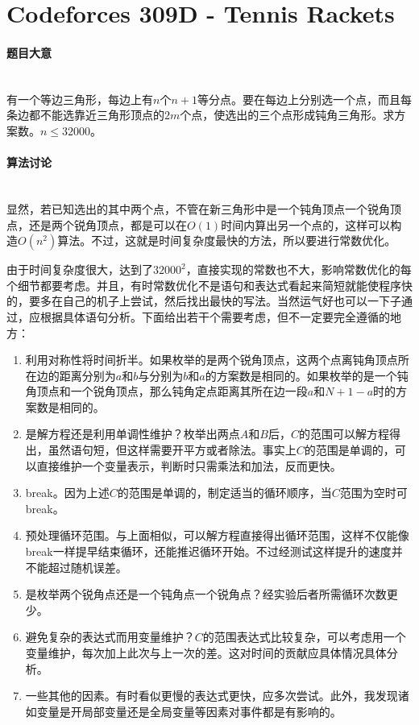 \documentclass[UTF8]{ctexart}
\newcommand{\myparagraph}[1]{\paragraph{#1}\mbox{}\\}
\theoremstyle{nonumberplain}
\begin{document}
	\section{Codeforces 309D - Tennis Rackets}
	
		\myparagraph{题目大意}
		
			有一个等边三角形，每边上有$n$个$n+1$等分点。要在每边上分别选一个点，而且每条边都不能选靠近三角形顶点的$2m$个点，使选出的三个点形成钝角三角形。求方案数。$n \leq 32000$。
		
		\myparagraph{算法讨论}
		
			显然，若已知选出的其中两个点，不管在新三角形中是一个钝角顶点一个锐角顶点，还是两个锐角顶点，都是可以在$O(1)$时间内算出另一个点的，这样可以构造$O(n^2)$算法。不过，这就是时间复杂度最快的方法，所以要进行常数优化。
			
			由于时间复杂度很大，达到了$32000^2$，直接实现的常数也不大，影响常数优化的每个细节都要考虑。并且，有时常数优化不是语句和表达式看起来简短就能使程序快的，要多在自己的机子上尝试，然后找出最快的写法。当然运气好也可以一下子通过，应根据具体语句分析。下面给出若干个需要考虑，但不一定要完全遵循的地方：
			
			\begin{enumerate}
				\item 利用对称性将时间折半。如果枚举的是两个锐角顶点，这两个点离钝角顶点所在边的距离分别为$a$和$b$与分别为$b$和$a$的方案数是相同的。如果枚举的是一个钝角顶点和一个锐角顶点，那么钝角定点距离其所在边一段$a$和$N+1-a$时的方案数是相同的。
				\item 是解方程还是利用单调性维护？枚举出两点$A$和$B$后，$C$的范围可以解方程得出，虽然语句短，但这样需要开平方或者除法。事实上$C$的范围是单调的，可以直接维护一个变量表示，判断时只需乘法和加法，反而更快。
				\item break。因为上述$C$的范围是单调的，制定适当的循环顺序，当$C$范围为空时可break。
				\item 预处理循环范围。与上面相似，可以解方程直接得出循环范围，这样不仅能像break一样提早结束循环，还能推迟循环开始。不过经测试这样提升的速度并不能超过随机误差。
				\item 是枚举两个锐角点还是一个钝角点一个锐角点？经实验后者所需循环次数更少。
				\item 避免复杂的表达式而用变量维护？$C$的范围表达式比较复杂，可以考虑用一个变量维护，每次加上此次与上一次的差。这对时间的贡献应具体情况具体分析。
				\item 一些其他的因素。有时看似更慢的表达式更快，应多次尝试。此外，我发现诸如变量是开局部变量还是全局变量等因素对事件都是有影响的。
				
			\end{enumerate}
		
\end{document}
